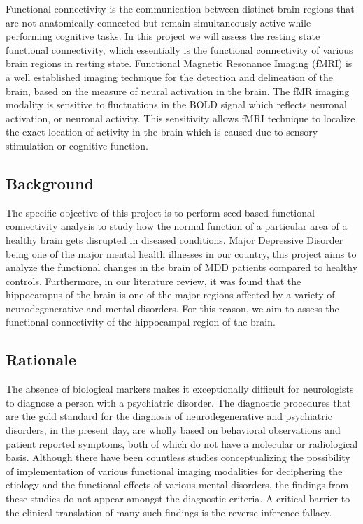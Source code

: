 \documentclass[12pt]{article}
\begin{document}
Functional connectivity is the communication between distinct brain
regions that are not anatomically connected but remain simultaneously
active while performing cognitive tasks. In this project we will
assess the resting state functional connectivity, which essentially is
the functional connectivity of various brain regions in resting state.
Functional Magnetic Resonance Imaging (fMRI) is a well established
imaging technique for the detection and delineation of the brain,
based on the measure of neural activation in the brain. The fMR
imaging modality is sensitive to fluctuations in the BOLD signal which
reflects neuronal activation, or neuronal activity. This sensitivity
allows fMRI technique to localize the exact location of activity in
the brain which is caused due to sensory stimulation or cognitive
function.

\subsection{Background}

The specific objective of this project is to perform seed-based
functional connectivity analysis to study how the normal function of a
particular area of a healthy brain gets disrupted in diseased
conditions. Major Depressive Disorder being one of the major mental
health illnesses in our country, this project aims to analyze the
functional changes in the brain of MDD patients compared to healthy
controls. Furthermore, in our literature review, it was found that the
hippocampus of the brain is one of the major regions affected by a
variety of neurodegenerative and mental disorders. For this reason, we
aim to assess the functional connectivity of the hippocampal region of
the brain.

\subsection{Rationale}

The absence of biological markers makes it exceptionally difficult for
neurologists to diagnose a person with a psychiatric disorder. The
diagnostic procedures that are the gold standard for the diagnosis of
neurodegenerative and psychiatric disorders, in the present day, are
wholly based on behavioral observations and patient reported symptoms,
both of which do not have a molecular or radiological basis. Although
there have been countless studies conceptualizing the possibility of
implementation of various functional imaging modalities for
deciphering the etiology and the functional effects of various mental
disorders, the findings from these studies do not appear amongst the
diagnostic criteria. A critical barrier to the clinical translation of
many such findings is the reverse inference fallacy.
\end{document}

